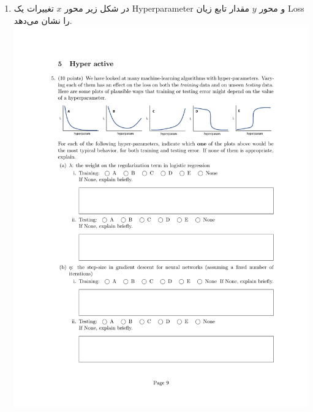 \begin{enumerate}[leftmargin=17pt]
\item 
در شکل زیر محور 
$x$
تغییرات یک 
Hyperparameter
و محور 
$y$
مقدار تابع زیان Loss را نشان می‌دهد.
\includegraphics{images/1.pdf}
\vspace{1cm}


\end{enumerate}
